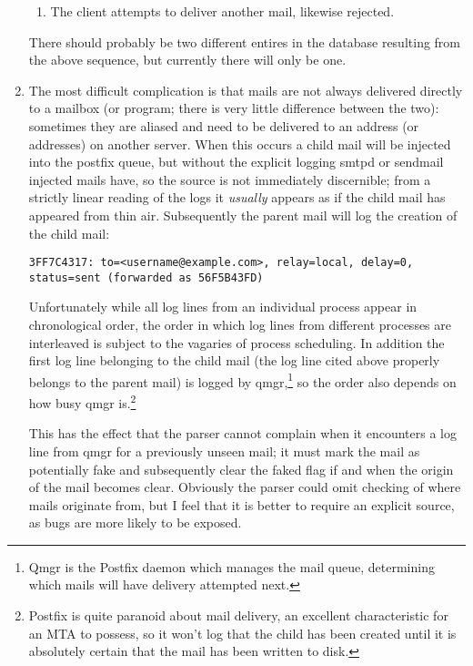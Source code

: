 \documentclass[a4paper,12pt,draft]{article}
\begin{document}
\begin{enumerate}
\begin{enumerate}
            \item The client attempts to deliver another mail, likewise
                rejected.

        \end{enumerate}

        There should probably be two different entires in the database
        resulting from the above sequence, but currently there will only be
        one.

    \item The most difficult complication is that mails are not always
        delivered directly to a mailbox (or program; there is very little
        difference between the two): sometimes they are aliased and
        need to be delivered to an address (or addresses) on another
        server.  When this occurs a child mail will be injected into the
        postfix queue, but without the explicit logging smtpd or sendmail
        injected mails have, so the source is not immediately discernible;
        from a strictly linear reading of the logs it \textit{usually\/}
        appears as if the child mail has appeared from thin air.
        Subsequently the parent mail will log the creation of the child
        mail:

        \texttt{3FF7C4317: to=<username@example.com>, relay=local, \newline 
        delay=0, status=sent (forwarded as 56F5B43FD)}

        Unfortunately while all log lines from an individual process appear
        in chronological order, the order in which log lines from different
        processes are interleaved is subject to the vagaries of process
        scheduling.  In addition the first log line belonging to the child
        mail (the log line cited above properly belongs to the parent mail)
        is logged by qmgr,\footnote{Qmgr is the Postfix daemon which
        manages the mail queue, determining which mails will have delivery
        attempted next.} so the order also depends on how busy qmgr
        is.\footnote{Postfix is quite paranoid about mail delivery, an
        excellent characteristic for an MTA to possess, so it won't log
        that the child has been created until it is absolutely certain that
        the mail has been written to disk.}

        This has the effect that the parser cannot complain when it
        encounters a log line from qmgr for a previously unseen mail; it
        must mark the mail as potentially fake and subsequently clear the
        faked flag if and when the origin of the mail becomes clear.
        Obviously the parser could omit checking of where mails originate
        from, but I feel that it is better to require an explicit source,
        as bugs are more likely to be exposed.


\end{enumerate}
\end{document}
